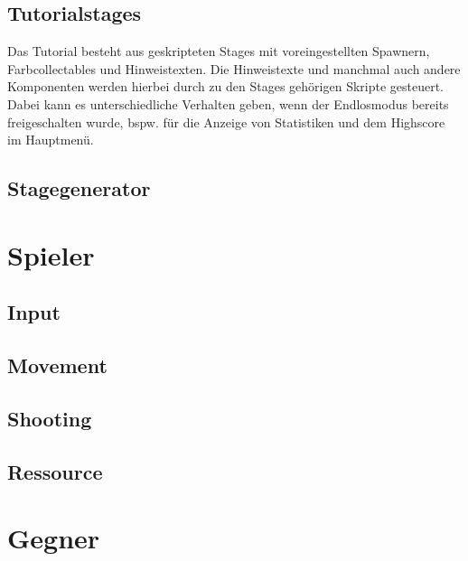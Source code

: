 \subsection{Tutorialstages}

Das Tutorial besteht aus geskripteten Stages mit voreingestellten Spawnern, Farbcollectables und Hinweistexten. Die Hinweistexte und manchmal auch andere Komponenten werden hierbei durch zu den Stages gehörigen Skripte gesteuert. Dabei kann es unterschiedliche Verhalten geben, wenn der Endlosmodus bereits freigeschalten wurde, bspw. für die Anzeige von Statistiken und dem Highscore im Hauptmenü.



\subsection{Stagegenerator}

\lipsum[3]



\section{Spieler}

\lipsum[3]



\subsection{Input}

\lipsum[3]


\subsection{Movement}

\lipsum[3]


\subsection{Shooting}

\lipsum[3]


\subsection{Ressource}

\lipsum[3]




\section{Gegner}


